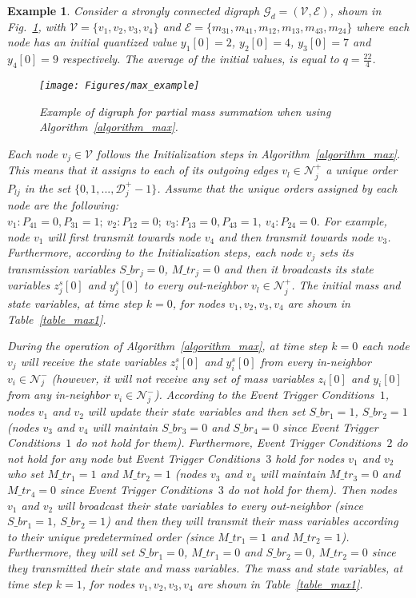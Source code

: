 \documentclass[twocolumn]{autart}    %
\newtheorem{example}{\bfseries Example}
\begin{document}
\begin{example}
Consider a strongly connected digraph $\mathcal{G}_d = (\mathcal{V}, \mathcal{E})$, shown in Fig.~\ref{max_example}, with $\mathcal{V} = \{ v_1, v_2, v_3, v_4 \}$ and $\mathcal{E} = \{ m_{31}, m_{41}, m_{12}, m_{13}, m_{43}, m_{24} \}$ where each node has an initial quantized value $y_1[0] = 2$, $y_2[0] = 4$, $y_3[0] = 7$ and $y_4[0] = 9$ respectively. 
The average of the initial values, is equal to $q = \frac{22}{4}$. 

\begin{figure}[h]
\begin{center}
\texttt{[image: Figures/max\_example]}
\caption{Example of digraph for partial mass summation when using Algorithm~\ref{algorithm_max}.}
\label{max_example}
\end{center}
\end{figure}

Each node $v_j \in \mathcal{V}$ follows the Initialization steps in Algorithm~\ref{algorithm_max}. 
This means that it assigns to each of its outgoing edges $v_l \in \mathcal{N}^+_j$ a unique order $P_{lj}$ in the set $\{0,1,..., \mathcal{D}_j^+ -1\}$. 
Assume that the unique orders assigned by each node are the following:
$
v_1: P_{41} = 0, P_{31} = 1; \ v_2: P_{12} = 0; \ v_3: P_{13} = 0, P_{43} = 1, \ v_4: P_{24} = 0.  
$
For example, node $v_1$ will first transmit towards node $v_4$ and then transmit towards node $v_3$. 
Furthermore, according to the Initialization steps, each node $v_j$ sets its transmission variables $S\_br_j = 0$, $M\_tr_j = 0$ and then it broadcasts its state variables $z^s_j[0]$ and $y^s_j[0]$ to every out-neighbor $v_l \in \mathcal{N}_j^+$.
The initial mass and state variables, at time step $k=0$, for nodes $v_1, v_2, v_3, v_4$ are shown in Table~\ref{table_max1}. 

During the operation of Algorithm~\ref{algorithm_max}, at time step $k=0$ each node $v_j$ will receive the state variables $z^s_i[0]$ and $y^s_i[0]$ from every in-neighbor $v_i \in \mathcal{N}_j^-$ (however, it will not receive any set of mass variables $z_i[0]$ and $y_i[0]$ from any in-neighbor $v_i \in \mathcal{N}_j^-$). 
According to the Event Trigger Conditions~$1$, nodes $v_1$ and $v_2$ will update their state variables and then set $S\_br_1 = 1$, $S\_br_2 = 1$ (nodes $v_3$ and $v_4$ will maintain $S\_br_3 = 0$ and $S\_br_4 = 0$ since Event Trigger Conditions~$1$ do not hold for them). 
Furthermore, Event Trigger Conditions~$2$ do not hold for any node but Event Trigger Conditions~$3$ hold for nodes $v_1$ and $v_2$ who set $M\_tr_1 = 1$ and $M\_tr_2 = 1$ (nodes $v_3$ and $v_4$ will maintain $M\_tr_3 = 0$ and $M\_tr_4 = 0$ since Event Trigger Conditions~$3$ do not hold for them). 
Then nodes $v_1$ and $v_2$ will broadcast their state variables to every out-neighbor (since $S\_br_1 = 1$, $S\_br_2 = 1$) and then they will transmit their mass variables according to their unique predetermined order (since $M\_tr_1 = 1$ and $M\_tr_2 = 1$). 
Furthermore, they will set $S\_br_1 = 0$, $M\_tr_1 = 0$ and $S\_br_2 = 0$, $M\_tr_2 = 0$ since they transmitted their state and mass variables. 
The mass and state variables, at time step $k=1$, for nodes $v_1, v_2, v_3, v_4$ are shown in Table~\ref{table_max1}. 



\end{example}
\end{document}
